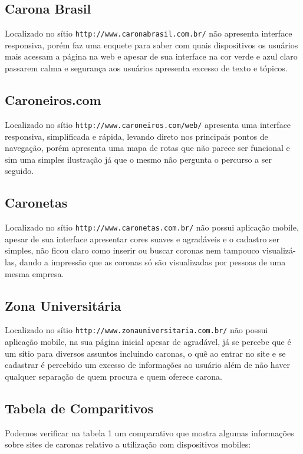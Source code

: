 \documentclass{sig-alternate}
\begin{document}
\subsection{Carona Brasil}
Localizado no sítio {\tt  http://www.caronabrasil.com.br/} não apresenta 
interface responsiva, porém faz uma enquete para saber com quais dispositivos 
os usuários mais acessam a página na web e apesar de sua interface na cor verde 
e azul claro passarem calma e segurança aos usuários apresenta excesso de texto 
e tópicos.

\subsection{Caroneiros.com}
Localizado no sítio {\tt  http://www.caroneiros.com/web/} apresenta 
uma interface responsiva, simplificada e rápida, levando direto nos principais 
pontos de navegação, porém apresenta uma mapa de rotas que não parece ser 
funcional e sim uma simples ilustração já que o mesmo não pergunta o percurso a 
ser seguido.

\subsection{Caronetas}
Localizado no sítio {\tt http://www.caronetas.com.br/} não possui aplicação mobile, 
apesar de sua interface apresentar cores suaves e agradáveis e o cadastro ser 
simples, não ficou claro como inserir ou buscar coronas nem tampouco visualizá-las, 
dando a impressão que as coronas só são visualizadas por pessoas de uma mesma 
empresa.

\subsection{Zona Universitária}
Localizado no sítio {\tt http://www.zonauniversitaria.com.br/} não possui 
aplicação mobile, na sua página inicial apesar de agradável, já se 
percebe que é um sítio para diversos assuntos incluindo caronas, o quê 
ao entrar no site e se cadastrar é percebido um excesso de informações 
ao usuário além de não haver qualquer separação de quem procura e quem 
oferece carona.

\subsection{Tabela de Comparitivos}
Podemos verificar na tabela 1 um comparativo que mostra algumas informações 
sobre sites de caronas relativo a utilização com dispositivos mobiles:
\end{document}
